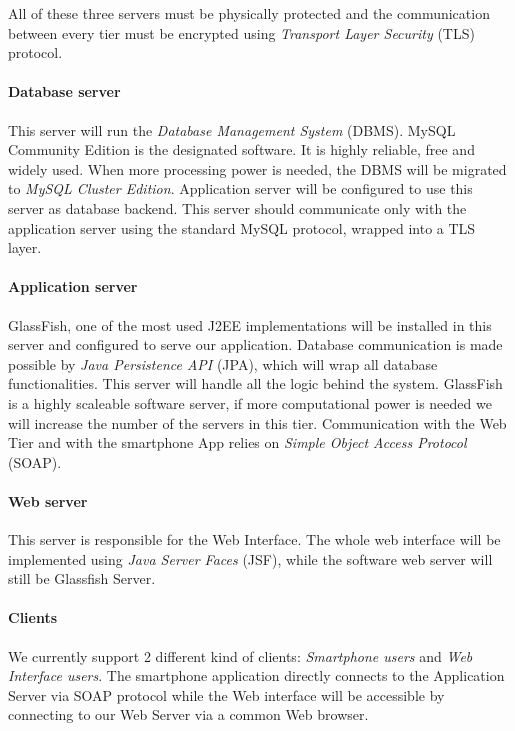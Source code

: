 All of these three servers must be physically protected and the communication between
every tier must be encrypted using \emph{Transport Layer Security} (TLS) protocol.

\paragraph{Database server} This server will run the \emph{Database Management System}
(DBMS).
MySQL Community Edition is the designated software. It is highly reliable, free
and widely used. When more processing power is needed, the DBMS will be 
migrated to \emph{MySQL Cluster Edition}. Application server will be configured 
to use this server as database backend.
This server should communicate only with the application server using the standard
MySQL protocol, wrapped into a TLS layer.

\paragraph{Application server} GlassFish, one of the most used J2EE implementations
will be installed in this server and configured to serve our application.
Database communication is made possible by \emph{Java Persistence API} (JPA), which will wrap all
database functionalities. This server will handle all the logic behind the system.
GlassFish is a highly scaleable software server, if more computational power 
is needed we will increase the number of the servers in this tier.
Communication with the Web Tier and with the smartphone App relies on 
\emph{Simple Object Access Protocol} (SOAP).

\paragraph{Web server} This server is responsible for the Web Interface.
The whole web interface will be implemented using \emph{Java Server Faces} (JSF), while 
the software web server will still be Glassfish Server.

\paragraph{Clients}
We currently support 2 different kind of clients: \emph{Smartphone users} and 
\emph{Web Interface users}.
The smartphone application directly connects to the Application Server via SOAP protocol
while the Web interface will be accessible by connecting to our Web Server via
a common Web browser.

